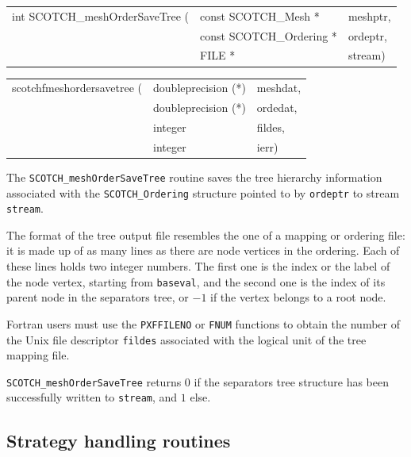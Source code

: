 \begin{itemize}
\progsyn

{\tt\begin{tabular}{l@{}ll}
int SCOTCH\_meshOrderSaveTree ( & const SCOTCH\_Mesh *     & meshptr, \\
                                & const SCOTCH\_Ordering * & ordeptr, \\
                                & FILE *                   & stream)
\end{tabular}}

{\tt\begin{tabular}{l@{}ll}
scotchfmeshordersavetree ( & doubleprecision (*) & meshdat, \\
                           & doubleprecision (*) & ordedat, \\
                           & integer             & fildes,  \\
                           & integer             & ierr)
\end{tabular}}

\progdes

The {\tt SCOTCH\_meshOrderSaveTree} routine saves the tree
hierarchy information associated with the {\tt SCOTCH\_\lbt Ordering}
structure pointed to by {\tt ordeptr} to stream {\tt stream}.

The format of the tree output file resembles the one of a mapping or
ordering file: it is made up of as many lines as there are node
vertices in the ordering. Each of these lines holds two integer
numbers. The first one is the index or the label of the node vertex,
starting from {\tt baseval}, and the second one is the index of its
parent node in the separators tree, or $-1$ if the vertex belongs to a
root node.

Fortran users must use the {\tt PXFFILENO} or {\tt FNUM} functions to
obtain the number of the Unix file descriptor {\tt fildes} associated
with the logical unit of the tree mapping file.

\progret

{\tt SCOTCH\_meshOrderSaveTree} returns $0$ if the separators tree
structure has been successfully written to {\tt stream}, and $1$ else.
\end{itemize}

\subsection{Strategy handling routines}
\label{sec-lib-strat}

